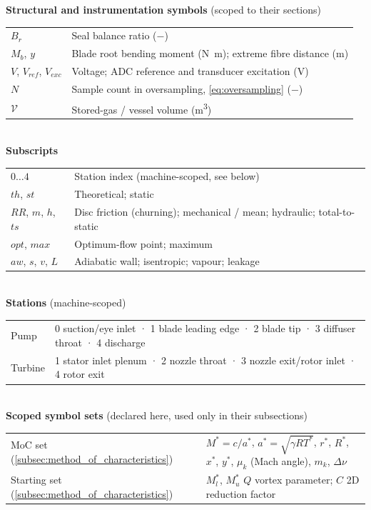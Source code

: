 \noindent\textbf{Structural and instrumentation symbols} (scoped to their sections)\\[2pt]
\begin{tabular}{ll}
  $B_r$ & Seal balance ratio ($-$) \\
  $M_b$, $y$ & Blade root bending moment (\si{\newton\meter}); extreme fibre distance (\si{\meter}) \\
  $V$, $V_{ref}$, $V_{exc}$ & Voltage; ADC reference and transducer excitation (\si{\volt}) \\
  $N$ & Sample count in oversampling, \cref{eq:oversampling} ($-$) \\
  $\mathcal{V}$ & Stored-gas / vessel volume (\si{\cubic\meter}) \\
\end{tabular}
\\[8pt]

\noindent\textbf{Subscripts}\\[2pt]
\begin{tabular}{ll}
  $0\ldots4$ & Station index (machine-scoped, see below) \\
  $th$, $st$ & Theoretical; static \\
  $RR$, $m$, $h$, $ts$ & Disc friction (churning); mechanical / mean; hydraulic; total-to-static \\
  $opt$, $max$ & Optimum-flow point; maximum \\
  $aw$, $s$, $v$, $L$ & Adiabatic wall; isentropic; vapour; leakage \\
\end{tabular}
\\[8pt]


\noindent\textbf{Stations} (machine-scoped)\\[2pt]
\begin{tabular}{ll}
  Pump & 0 suction/eye inlet · 1 blade leading edge · 2 blade tip · 3 diffuser throat · 4 discharge \\
  Turbine & 1 stator inlet plenum · 2 nozzle throat · 3 nozzle exit/rotor inlet · 4 rotor exit \\
\end{tabular}
\\[8pt]

\noindent\textbf{Scoped symbol sets} (declared here, used only in their subsections)\\[2pt]
\begin{tabular}{ll}
  MoC set (\cref{subsec:method_of_characteristics}) & $M^* = c/a^*$, $a^* = \sqrt{\gamma R T^*}$, $r^*$, $R^*$, $x^*$, $y^*$, $\mu_k$ (Mach angle), $m_k$, $\Delta\nu$ \\
  Starting set (\cref{subsec:method_of_characteristics}) & $M^*_l$, $M^*_u$ $Q$ vortex parameter; $C$ 2D reduction factor \\
\end{tabular}
\\[8pt]
